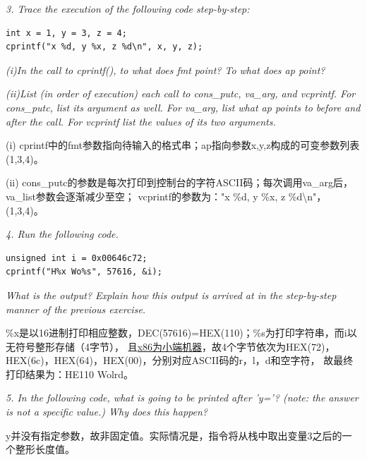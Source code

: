\documentclass[12pt, letterpaper]{report}
\begin{document}
\textsl{3. Trace the execution of the following code step-by-step:} \par
\lstset{style=CStyle}
\setmainfont{Consolas}
\begin{lstlisting}
int x = 1, y = 3, z = 4;
cprintf("x %d, y %x, z %d\n", x, y, z);
\end{lstlisting}
\setmainfont{Times New Roman}
\quad \quad
\textsl{(i)In the call to cprintf(), to what does fmt point? To what does ap point?} \par 
\textsl{(ii)List (in order of execution) each call to cons\_putc, va\_arg, and vcprintf. 
        For cons\_putc, list its argument as well. For va\_arg, list what ap points to before and after the call. 
        For vcprintf list the values of its two arguments.} \par
\quad \par 
(i) cprintf中的fmt参数指向待输入的格式串；ap指向参数x,y,z构成的可变参数列表(1,3,4)。\par 
(ii) cons\_putc的参数是每次打印到控制台的字符ASCII码；每次调用va\_arg后，va\_list参数会逐渐减少至空；
     vcprintf的参数为："x \%d, y \%x, z \%d\textbackslash n"，(1,3,4)。\par
\quad \par 


\textsl{4. Run the following code.} \par
\lstset{style=CStyle}
\setmainfont{Consolas}
\begin{lstlisting}
unsigned int i = 0x00646c72;
cprintf("H%x Wo%s", 57616, &i);
\end{lstlisting}
\setmainfont{Times New Roman}
\quad \quad
\textsl{What is the output? Explain how this output 
        is arrived at in the step-by-step manner of the previous exercise.} \par 
\quad \par 
\%x是以16进制打印相应整数，DEC(57616)=HEX(110)；\%s为打印字符串，而i以无符号整形存储（4字节），
且\underline{x86为小端机器}，故4个字节依次为HEX(72)，HEX(6c)，HEX(64)，HEX(00)，分别对应ASCII码的r，l，d和空字符，
故最终打印结果为：HE110 Wolrd。\par 
\quad \par


\textsl{5. In the following code, what is going to be printed after 'y='? 
        (note: the answer is not a specific value.) Why does this happen?} \par
\quad \par 
y并没有指定参数，故非固定值。实际情况是，指令将从栈中取出变量3之后的一个整形长度值。\par 
\quad \par
\end{document}
